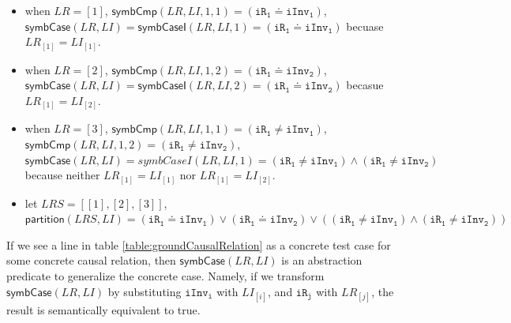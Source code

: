 \documentclass[final]{IEEEtran}
\def \eqc {\doteq }
\def \iInv {iInv}
\def \iR {iR}
\begin{document}
\begin{itemize}

  \item when $LR=[1]$, $\mathsf{symbCmp}(LR,LI,1,1)=(\mathtt{\iR_1} \eqc \mathtt{\iInv_1})$, $\mathsf{symbCase}(LR,LI)=\mathsf{symbCaseI}(LR,LI,1)=(\mathtt{\iR_1} \eqc \mathtt{\iInv_1})$ becuase $LR_{[1]}=LI_{[1]}$.

  \item when $LR=[2]$, $\mathsf{symbCmp}(LR,LI,1,2)= (\mathtt{\iR_1} \eqc \mathtt{\iInv_2})$, $\mathsf{symbCase}(LR,LI)=\mathsf{symbCaseI}(LR,LI,2)=(\mathtt{\iR_1} \eqc \mathtt{\iInv_2})$ becasue $LR_{[1]}=LI_{[2]}$.


 \item when  $LR=[3]$, $\mathsf{symbCmp}(LR,LI,1,1)=(\mathtt{\iR_1} \ne \mathtt{\iInv_1})$, $\mathsf{symbCmp}(LR,LI,1,2) = (\mathtt{\iR_1} \ne \mathtt{\iInv_2})$, $\mathsf{symbCase}(LR,LI)=symbCaseI(LR,LI,1)= (\mathtt{\iR_1} \ne \mathtt{\iInv_1}) \wedge  (\mathtt{\iR_1} \ne \mathtt{\iInv_2})$ because neither $LR_{[1]}=LI_{[1]}$ nor $LR_{[1]}=LI_{[2]}$.

  \item let $LRS=[[1],[2],[3]]$, $\mathsf{partition}(LRS,LI)= (\mathtt{\iR_1} \eqc \mathtt{\iInv_1}) \vee (\mathtt{\iR_1} \eqc \mathtt{\iInv_2}) \vee ( (\mathtt{\iR_1} \ne \mathtt{\iInv_1}) \wedge  (\mathtt{\iR_1} \ne \mathtt{\iInv_2}))$
\end{itemize}

If we see a line  in table \ref{table:groundCausalRelation} as a concrete test case for some concrete causal relation,  then $\mathsf{symbCase}(LR, LI)$ is an abstraction predicate to generalize the concrete case. Namely, if we transform $\mathsf{symbCase}(LR, LI)$ by substituting $\mathtt{\iInv_i}$ with $LI_{[i]}$, and $\mathtt{\iR_j}$ with $LR_{[j]}$, the result is semantically equivalent to true. %
\end{document}

